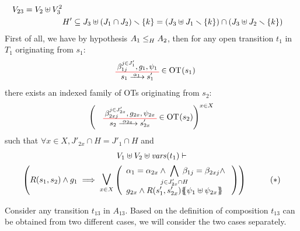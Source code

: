\documentclass[runningheads]{llncs}
\begin{document}
\begin{enumerate}
\begin{align*}
V_{23}= V_2\uplus V^2_3\\
& H' \subseteq J_3\uplus \mpar{J_1 \cap J_2} \setminus \{k\} = \mpar{J_3\uplus J_1 \setminus \{k\} } \cap \mpar{J_3\uplus J_2 \setminus \{k\}} \\
\end{align*}
First of all, we have by hypothesis $\wrel{A_1}{A_2}{H}$, then for any open transition $t_1$ in $T_1$  originating from $s_1$:
\begin{align*}
\OTx{1}{}{1}{1} \in \fOT{s_1}
\end{align*}
there exists an indexed family of OTs originating from $s_{2}$: 
\begin{align*}
\mpar{\OTx{2}{x}{2x}{2x} \in \fOT{s_{2}}}^{x \in X} 
\end{align*}
such that $\forall x \in X, J'_{2x} \cap H = J'_1 \cap H$ and
\begin{multline*}
V_1 \uplus V_2 \uplus \fvars{t_1} \vdash\\ \mpar{R\mpar{s_1, s_{2}} \wedge g_1 \implies \operatorname*{\bigsymb{\bigvee}}_{x \in X} \mpar{\everymath{\displaystyle}
\begin{array}{l}
			\alpha_1 = \alpha_{2x} \wedge \bigwedge_\subbox{j \in J'_{2x} \cap H} \beta_{1j} = \beta_{2xj} \nwedge\\
			 g_{2x} \wedge R\mpar{s'_1, s'_{2x}}\psubst{\psi_1 \uplus \psi_{2x}}
		\end{array}}}  \qquad \quad (*)
\end{multline*}	
\smallskip

Consider any transition $t_{13}$ in $A_{13}$.  Based on  the definition of composition $t_{13}$ can be obtained from two different cases, we will consider the two cases separately. 

\end{enumerate}
\end{document}
